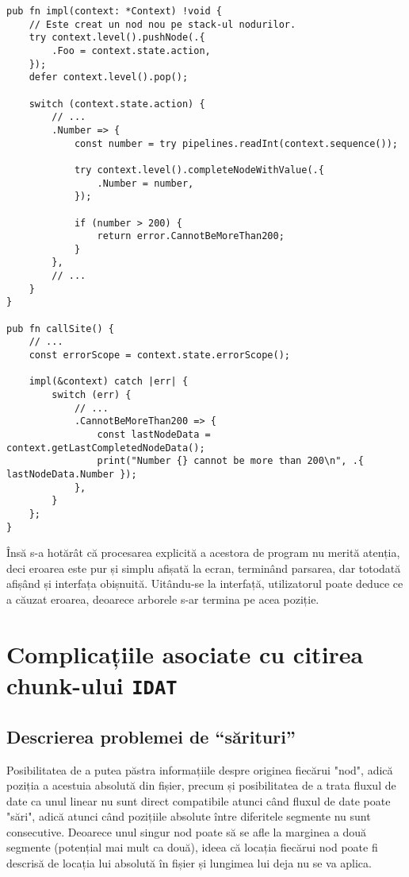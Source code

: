 \documentclass[a4paper,12pt]{report}
\begin{document}
\begin{verbatim}
pub fn impl(context: *Context) !void {
    // Este creat un nod nou pe stack-ul nodurilor.
    try context.level().pushNode(.{
        .Foo = context.state.action,
    });
    defer context.level().pop();

    switch (context.state.action) {
        // ...
        .Number => {
            const number = try pipelines.readInt(context.sequence());

            try context.level().completeNodeWithValue(.{
                .Number = number,
            });

            if (number > 200) {
                return error.CannotBeMoreThan200;
            }
        },
        // ...
    }
}

pub fn callSite() {
    // ... 
    const errorScope = context.state.errorScope();

    impl(&context) catch |err| {
        switch (err) {
            // ...
            .CannotBeMoreThan200 => {
                const lastNodeData = context.getLastCompletedNodeData();
                print("Number {} cannot be more than 200\n", .{ lastNodeData.Number });
            },
        }
    };
}
\end{verbatim}

Însă s-a hotărât că procesarea explicită a acestora de program nu merită atenția,
deci eroarea este pur și simplu afișată la ecran, terminând parsarea,
dar totodată afișând și interfața obișnuită.
Uitându-se la interfață, utilizatorul poate deduce ce a căuzat eroarea,
deoarece arborele s-ar termina pe acea poziție.

\section{Complicațiile asociate cu citirea chunk-ului \texttt{IDAT}}

\subsection{Descrierea problemei de ``sărituri''}

Posibilitatea de a putea păstra informațiile despre originea fiecărui "nod",
adică poziția a acestuia absolută din fișier,
precum și posibilitatea de a trata fluxul de date ca unul linear nu sunt direct compatibile
atunci când fluxul de date poate "sări", adică atunci când pozițiile absolute
între diferitele segmente nu sunt consecutive.
Deoarece unul singur nod poate să se afle la marginea a două segmente (potențial mai mult ca două),
ideea că locația fiecărui nod poate fi descrisă de locația lui absolută în fișier și
lungimea lui deja nu se va aplica.
\end{document}
